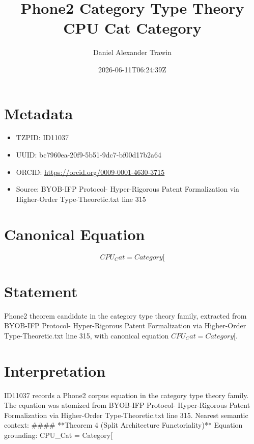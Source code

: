 \documentclass[11pt]{article}
\title{Phone2 Category Type Theory CPU Cat Category}
\author{Daniel Alexander Trawin}
\date{2026-06-11T06:24:39Z}
\begin{document}
\maketitle
\section*{Metadata}
\begin{itemize}
\item TZPID: ID11037
\item UUID: bc7960ea-20f9-5b51-9dc7-bf00d17b2a64
\item ORCID: \url{https://orcid.org/0009-0001-4630-3715}
\item Source: BYOB-IFP Protocol- Hyper-Rigorous Patent Formalization via Higher-Order Type-Theoretic.txt line 315
\end{itemize}
\section*{Canonical Equation}
\[
CPU_Cat = Category[
\]
\section*{Statement}
Phone2 theorem candidate in the category type theory family, extracted from BYOB-IFP Protocol- Hyper-Rigorous Patent Formalization via Higher-Order Type-Theoretic.txt line 315, with canonical equation $CPU_Cat = Category[$.
\section*{Interpretation}
ID11037 records a Phone2 corpus equation in the category type theory family. The equation was atomized from BYOB-IFP Protocol- Hyper-Rigorous Patent Formalization via Higher-Order Type-Theoretic.txt line 315. Nearest semantic context: #### **Theorem 4 (Split Architecture Functoriality)** Equation grounding: CPU_Cat = Category[
\end{document}
